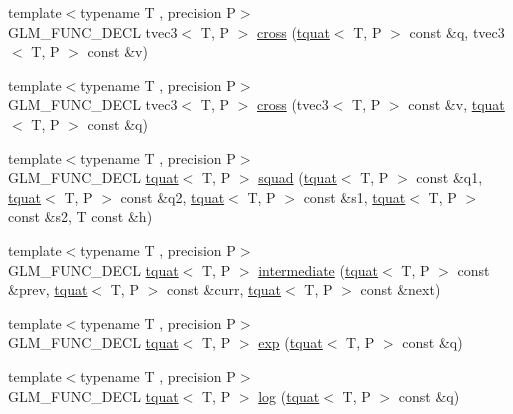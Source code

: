 \begin{DoxyCompactItemize}
\item 
{\footnotesize template$<$typename T , precision P$>$ }\\G\+L\+M\+\_\+\+F\+U\+N\+C\+\_\+\+D\+E\+C\+L tvec3$<$ T, P $>$ \hyperlink{group__gtx__quaternion_ga33ecf8ba903eee5fc09f0fbfc0d5ca6b}{cross} (\hyperlink{structglm_1_1tquat}{tquat}$<$ T, P $>$ const \&q, tvec3$<$ T, P $>$ const \&v)
\item 
{\footnotesize template$<$typename T , precision P$>$ }\\G\+L\+M\+\_\+\+F\+U\+N\+C\+\_\+\+D\+E\+C\+L tvec3$<$ T, P $>$ \hyperlink{group__gtx__quaternion_ga4bfe3c7770fc43d14b8ef0058c4a86b5}{cross} (tvec3$<$ T, P $>$ const \&v, \hyperlink{structglm_1_1tquat}{tquat}$<$ T, P $>$ const \&q)
\item 
{\footnotesize template$<$typename T , precision P$>$ }\\G\+L\+M\+\_\+\+F\+U\+N\+C\+\_\+\+D\+E\+C\+L \hyperlink{structglm_1_1tquat}{tquat}$<$ T, P $>$ \hyperlink{group__gtx__quaternion_gae75f537becdf2b1381b4482ec96e6c82}{squad} (\hyperlink{structglm_1_1tquat}{tquat}$<$ T, P $>$ const \&q1, \hyperlink{structglm_1_1tquat}{tquat}$<$ T, P $>$ const \&q2, \hyperlink{structglm_1_1tquat}{tquat}$<$ T, P $>$ const \&s1, \hyperlink{structglm_1_1tquat}{tquat}$<$ T, P $>$ const \&s2, T const \&h)
\item 
{\footnotesize template$<$typename T , precision P$>$ }\\G\+L\+M\+\_\+\+F\+U\+N\+C\+\_\+\+D\+E\+C\+L \hyperlink{structglm_1_1tquat}{tquat}$<$ T, P $>$ \hyperlink{group__gtx__quaternion_ga56abae85b3669c866e91f3c57b298b9c}{intermediate} (\hyperlink{structglm_1_1tquat}{tquat}$<$ T, P $>$ const \&prev, \hyperlink{structglm_1_1tquat}{tquat}$<$ T, P $>$ const \&curr, \hyperlink{structglm_1_1tquat}{tquat}$<$ T, P $>$ const \&next)
\item 
{\footnotesize template$<$typename T , precision P$>$ }\\G\+L\+M\+\_\+\+F\+U\+N\+C\+\_\+\+D\+E\+C\+L \hyperlink{structglm_1_1tquat}{tquat}$<$ T, P $>$ \hyperlink{group__gtx__quaternion_ga17295173d4c2b5ae49b84e9993b63a62}{exp} (\hyperlink{structglm_1_1tquat}{tquat}$<$ T, P $>$ const \&q)
\item 
{\footnotesize template$<$typename T , precision P$>$ }\\G\+L\+M\+\_\+\+F\+U\+N\+C\+\_\+\+D\+E\+C\+L \hyperlink{structglm_1_1tquat}{tquat}$<$ T, P $>$ \hyperlink{group__gtx__quaternion_ga791f42e134bfe97fc9c96f4668dd7489}{log} (\hyperlink{structglm_1_1tquat}{tquat}$<$ T, P $>$ const \&q)
\item 

\end{DoxyCompactItemize}
